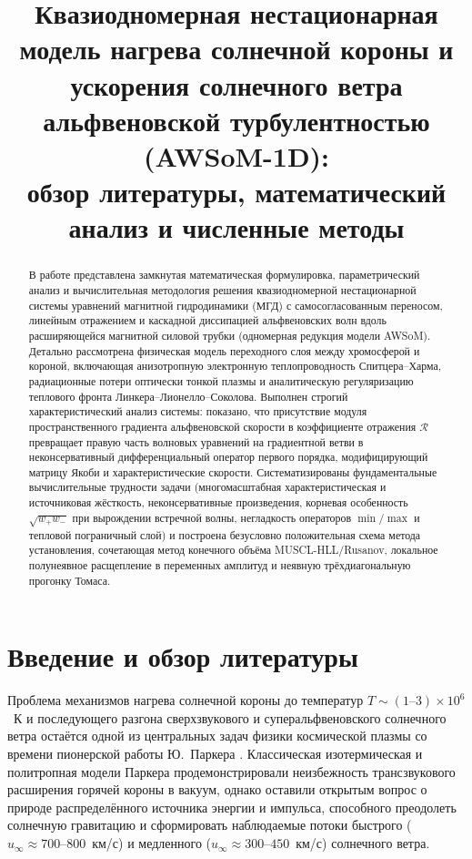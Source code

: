 \documentclass[11pt,a4paper]{article}
\title{\textbf{Квазиодномерная нестационарная модель нагрева солнечной короны и ускорения солнечного ветра альфвеновской турбулентностью (AWSoM-1D):\\ обзор литературы, математический анализ и численные методы}}
\author{}
\date{}
\begin{document}
\maketitle

\begin{abstract}
В работе представлена замкнутая математическая формулировка, параметрический анализ и вычислительная методология решения квазиодномерной нестационарной системы уравнений магнитной гидродинамики (МГД) с самосогласованным переносом, линейным отражением и каскадной диссипацией альфвеновских волн вдоль расширяющейся магнитной силовой трубки (одномерная редукция модели AWSoM). Детально рассмотрена физическая модель переходного слоя между хромосферой и короной, включающая анизотропную электронную теплопроводность Спитцера--Харма, радиационные потери оптически тонкой плазмы и аналитическую регуляризацию теплового фронта Линкера--Лионелло--Соколова. Выполнен строгий характеристический анализ системы: показано, что присутствие модуля пространственного градиента альфвеновской скорости в коэффициенте отражения $\mathcal{R}$ превращает правую часть волновых уравнений на градиентной ветви в неконсервативный дифференциальный оператор первого порядка, модифицирующий матрицу Якоби и характеристические скорости. Систематизированы фундаментальные вычислительные трудности задачи (многомасштабная характеристическая и источниковая жёсткость, неконсервативные произведения, корневая особенность $\sqrt{w_+ w_-}$ при вырождении встречной волны, негладкость операторов $\min/\max$ и тепловой пограничный слой) и построена безусловно положительная схема метода установления, сочетающая метод конечного объёма MUSCL-HLL/Rusanov, локальное полунеявное расщепление в переменных амплитуд и неявную трёхдиагональную прогонку Томаса.
\end{abstract}

\tableofcontents
\newpage

\section{Введение и обзор литературы}

Проблема механизмов нагрева солнечной короны до температур $T \sim (1\text{--}3)\times 10^6$~К и последующего разгона сверхзвукового и суперальфвеновского солнечного ветра остаётся одной из центральных задач физики космической плазмы со времени пионерской работы Ю.~Паркера \cite{Parker1958}. Классическая изотермическая и политропная модели Паркера продемонстрировали неизбежность трансзвукового расширения горячей короны в вакуум, однако оставили открытым вопрос о природе распределённого источника энергии и импульса, способного преодолеть солнечную гравитацию и сформировать наблюдаемые потоки быстрого ($u_\infty \approx 700\text{--}800$~км/с) и медленного ($u_\infty \approx 300\text{--}450$~км/с) солнечного ветра.
\end{document}
